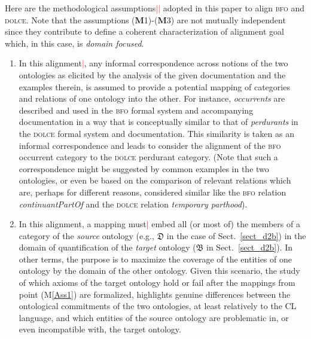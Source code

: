\documentclass[ao]{iosart2x}
\newcommand{\nb}[1]{\textcolor{red}{$|$}\marginpar{\hspace*{-0cm}\parbox{20mm}{\scriptsize\raggedright\textcolor{red}{#1}}}}
\newcommand{\dolce}{{\textsc{dolce}}}
\newcommand{\bfo}{{\textsc{bfo}}}
\newcommand {\thdolce} {\ensuremath{\mathfrak{D}}}
\newcommand {\thbfo} {\ensuremath{\mathfrak{B}}}
\begin{document}
Here are the methodological assumptions\nb{SB: il termine "methodological assumptions" non mi piace molto}\nb{CM: si può togliere methodological} adopted in this paper to align {\bfo} and {\dolce}. Note that the assumptions ({\bf M}1)-({\bf M}3) are not mutually independent since they contribute to define a coherent characterization of alignment goal which, in this case, is {\em domain focused}. 
%
\begin{enumerate}[({\bf M}1)]
\item \label{Ass1} In this alignment\nb{CM: cosa vuol dire? quale sarebbe questo alignment?}, any informal correspondence across notions of the two ontologies as elicited by the analysis of the given documentation and the examples therein, is assumed to provide a potential mapping of categories and relations of one ontology into the other. 
For instance, \emph{occurrents} 
are described and used in the {\bfo} formal system and accompanying documentation in a way that is conceptually similar to that of \emph{perdurants} in the {\dolce} formal system and documentation.
This similarity is taken as an informal correspondence and leads to consider the alignment of the {\bfo} occurrent category to the {\dolce} perdurant category. (Note that such a correspondence might be suggested by common examples in the two ontologies, or even be based on the comparison of relevant relations which are, perhaps for different reasons, considered similar like the {\bfo} relation \emph{continuantPartOf} and the {\dolce} relation \emph{temporary parthood}). 

\item \label{Ass2} In this alignment, a mapping must\nb{CM: mi sembra forte, c'è solo un tendere a massimizzare l'overlap tra domini} embed all (or most of) the members of a category of the \emph{source} ontology (e.g., {$\thdolce$} in the case of Sect.~\ref{sect_d2b}) in the domain of quantification of the \emph{target} ontology ({$\thbfo$} in Sect.~\ref{sect_d2b}). In other terms, the purpose is to maximize the coverage of the entities of one ontology by the domain of the other ontology. 
Given this scenario, the study of which axioms of the target ontology hold or fail after the mappings from point (M\ref{Ass1}) are formalized, highlights genuine differences between the ontological commitments of the two ontologies, at least relatively to the CL language, and which entities of the source ontology are problematic in, or even incompatible with, the target ontology.   


\end{enumerate}
\end{document}
